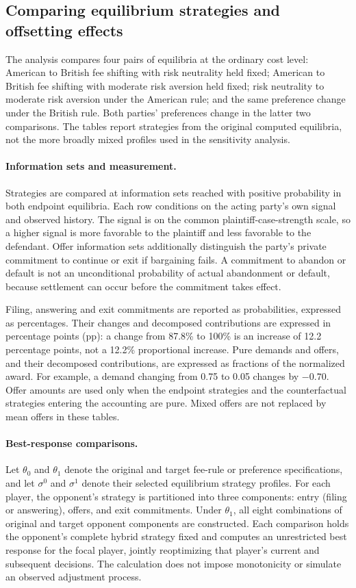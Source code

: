 \subsection{Comparing equilibrium strategies and offsetting effects}

The analysis compares four pairs of equilibria at the ordinary cost level:
American to British fee shifting with risk neutrality held fixed; American to
British fee shifting with moderate risk aversion held fixed; risk neutrality to
moderate risk aversion under the American rule; and the same preference change
under the British rule. Both parties' preferences change in the latter two
comparisons. The tables report strategies from the original computed equilibria,
not the more broadly mixed profiles used in the sensitivity analysis.

\paragraph{Information sets and measurement.}
Strategies are compared at information sets reached with positive probability
in both endpoint equilibria. Each row conditions on the acting party's own
signal and observed history. The signal is on the common plaintiff-case-strength
scale, so a higher signal is more favorable to the plaintiff and less favorable
to the defendant. Offer information sets additionally distinguish the party's
private commitment to continue or exit if bargaining fails. A commitment to
abandon or default is not an unconditional probability of actual abandonment or
default, because settlement can occur before the commitment takes effect.

Filing, answering and exit commitments are reported as probabilities, expressed
as percentages. Their changes and decomposed contributions are expressed in
percentage points (pp): a change from 87.8\% to 100\% is an increase of
12.2 percentage points, not a 12.2\% proportional increase. Pure demands and
offers, and their decomposed contributions, are expressed as fractions of the
normalized award. For example, a demand changing from 0.75 to 0.05 changes by
$-0.70$. Offer amounts are used only when the endpoint strategies and the
counterfactual strategies entering the accounting are pure. Mixed offers are
not replaced by mean offers in these tables.

\paragraph{Best-response comparisons.}
Let $\theta_0$ and $\theta_1$ denote the original and target fee-rule or preference
specifications, and let $\sigma^0$ and $\sigma^1$ denote their selected equilibrium
strategy profiles. For each player, the opponent's strategy is partitioned into
three components: entry (filing or answering), offers, and exit commitments.
Under $\theta_1$, all eight combinations of original and target opponent
components are constructed. Each comparison holds the opponent's complete
hybrid strategy fixed and computes an unrestricted best response for the focal
player, jointly reoptimizing that player's current and subsequent decisions.
The calculation does not impose monotonicity or simulate an observed
adjustment process.

